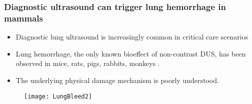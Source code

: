 \begin{frame}%
  \frametitle{\vspace*{0.25cm}Diagnostic ultrasound can trigger lung hemorrhage in mammals}
  {\footnotesize%
    \begin{itemize}%
    \item Diagnostic lung ultrasound is increasingly common in critical care scenarios \citep{Lichtenstein2009}
    \item Lung hemorrhage, the only known bioeffect of non-contrast
      DUS, has been observed in mice, rats, pigs, rabbits, monkeys
      \citep{Child1990,OBrien1997a,Tarantal1994a}.%
    \item The underlying physical damage mechanism is poorly understood.%
    \end{itemize}%
    \begin{figure}%
      \centering%
      \texttt{[image: LungBleed2]} \nocite{Miller2012}%
    \end{figure}%
  }
\end{frame}

